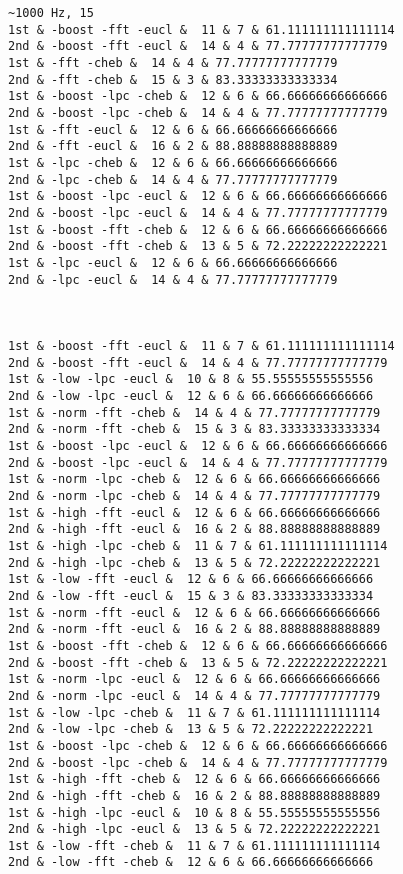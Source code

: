 \begin{verbatim}
~1000 Hz, 15
1st & -boost -fft -eucl &  11 & 7 & 61.111111111111114
2nd & -boost -fft -eucl &  14 & 4 & 77.77777777777779
1st & -fft -cheb &  14 & 4 & 77.77777777777779
2nd & -fft -cheb &  15 & 3 & 83.33333333333334
1st & -boost -lpc -cheb &  12 & 6 & 66.66666666666666
2nd & -boost -lpc -cheb &  14 & 4 & 77.77777777777779
1st & -fft -eucl &  12 & 6 & 66.66666666666666
2nd & -fft -eucl &  16 & 2 & 88.88888888888889
1st & -lpc -cheb &  12 & 6 & 66.66666666666666
2nd & -lpc -cheb &  14 & 4 & 77.77777777777779
1st & -boost -lpc -eucl &  12 & 6 & 66.66666666666666
2nd & -boost -lpc -eucl &  14 & 4 & 77.77777777777779
1st & -boost -fft -cheb &  12 & 6 & 66.66666666666666
2nd & -boost -fft -cheb &  13 & 5 & 72.22222222222221
1st & -lpc -eucl &  12 & 6 & 66.66666666666666
2nd & -lpc -eucl &  14 & 4 & 77.77777777777779



1st & -boost -fft -eucl &  11 & 7 & 61.111111111111114
2nd & -boost -fft -eucl &  14 & 4 & 77.77777777777779
1st & -low -lpc -eucl &  10 & 8 & 55.55555555555556
2nd & -low -lpc -eucl &  12 & 6 & 66.66666666666666
1st & -norm -fft -cheb &  14 & 4 & 77.77777777777779
2nd & -norm -fft -cheb &  15 & 3 & 83.33333333333334
1st & -boost -lpc -eucl &  12 & 6 & 66.66666666666666
2nd & -boost -lpc -eucl &  14 & 4 & 77.77777777777779
1st & -norm -lpc -cheb &  12 & 6 & 66.66666666666666
2nd & -norm -lpc -cheb &  14 & 4 & 77.77777777777779
1st & -high -fft -eucl &  12 & 6 & 66.66666666666666
2nd & -high -fft -eucl &  16 & 2 & 88.88888888888889
1st & -high -lpc -cheb &  11 & 7 & 61.111111111111114
2nd & -high -lpc -cheb &  13 & 5 & 72.22222222222221
1st & -low -fft -eucl &  12 & 6 & 66.66666666666666
2nd & -low -fft -eucl &  15 & 3 & 83.33333333333334
1st & -norm -fft -eucl &  12 & 6 & 66.66666666666666
2nd & -norm -fft -eucl &  16 & 2 & 88.88888888888889
1st & -boost -fft -cheb &  12 & 6 & 66.66666666666666
2nd & -boost -fft -cheb &  13 & 5 & 72.22222222222221
1st & -norm -lpc -eucl &  12 & 6 & 66.66666666666666
2nd & -norm -lpc -eucl &  14 & 4 & 77.77777777777779
1st & -low -lpc -cheb &  11 & 7 & 61.111111111111114
2nd & -low -lpc -cheb &  13 & 5 & 72.22222222222221
1st & -boost -lpc -cheb &  12 & 6 & 66.66666666666666
2nd & -boost -lpc -cheb &  14 & 4 & 77.77777777777779
1st & -high -fft -cheb &  12 & 6 & 66.66666666666666
2nd & -high -fft -cheb &  16 & 2 & 88.88888888888889
1st & -high -lpc -eucl &  10 & 8 & 55.55555555555556
2nd & -high -lpc -eucl &  13 & 5 & 72.22222222222221
1st & -low -fft -cheb &  11 & 7 & 61.111111111111114
2nd & -low -fft -cheb &  12 & 6 & 66.66666666666666



\end{verbatim}
